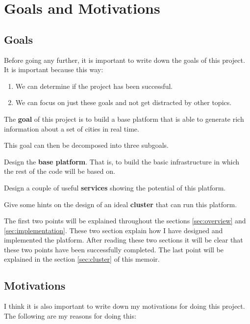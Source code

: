 
\section{Goals and Motivations}

\subsection{Goals}

Before going any further, it is important to write down the goals of this
project. It is important because this way:

\begin{enumerate}
  \itemsep0em
  \item We can determine if the project has been successful.
  \item We can focus on just these goals and not get distracted by other topics.
\end{enumerate}

The {\bf goal} of this project is to build a base platform that is able to
generate rich information about a set of cities in real time.

This goal can then be decomposed into three subgoals.

\mylist
  \item Design the {\bf base platform}. That is, to build the basic
infrastructure in which the rest of the code will be based on.
  \item Design a couple of useful {\bf services} showing the potential of this
platform.
  \item Give some hints on the design of an ideal {\bf cluster} that can run
this platform.
\mylistend

The first two points will be explained throughout the sections
\ref{sec:overview} and \ref{sec:implementation}. These two section explain
how I have designed and implemented the platform. After reading these two
sections it will be clear that these two points have been successfully
completed. The last point will be explained in the section \ref{sec:cluster}
of this memoir.

\subsection{Motivations}

I think it is also important to write down my motivations for doing this
project. The following are my reasons for doing this:

